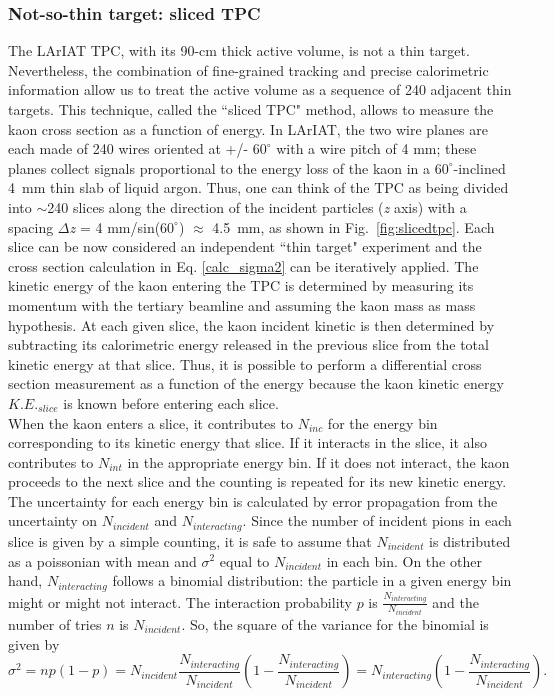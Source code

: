 \subsubsection{Not-so-thin target: sliced TPC}
\label{sec:thick}
The LArIAT TPC, with its 90-cm thick active volume, is not a thin target. Nevertheless, the combination of fine-grained tracking and precise calorimetric information allow us to treat the active volume as a sequence of 240 adjacent thin targets. This technique, called the ``sliced TPC" method, allows to measure the kaon cross section as a function of energy.  In LArIAT, the two wire planes are each made of 240 wires oriented at +/- $60^{\circ}$ with a wire pitch of 4 mm; these planes collect signals proportional to the energy loss of the kaon in a $60^{\circ}$-inclined 4~mm thin slab of liquid argon. Thus, one can think of the TPC as being divided into $\sim$240 slices along the direction of the incident particles ({\textit
{z}} axis) with a spacing $\Delta${\textit
{z}} = 4 mm/sin($60^{\circ}$) $\approx$ 4.5~mm, as shown in Fig.~\ref{fig:slicedtpc}. 
Each slice can be now considered an independent ``thin target" experiment and the cross section calculation in Eq. \ref{calc_sigma2} can be iteratively applied. The kinetic energy of the kaon entering the TPC is determined by measuring its momentum with the tertiary beamline and assuming the kaon mass as mass hypothesis. At each given slice, the kaon incident kinetic  is then determined by subtracting its calorimetric energy released in the previous slice from the total kinetic energy at that slice. Thus, it is possible to perform a differential cross section measurement as a function of the energy because the kaon kinetic energy $K.E._{slice}$  is known before entering each slice. \\ 
When the kaon enters a slice, it contributes to $N_{inc}$ for the energy bin corresponding to  its kinetic energy  that slice. If it interacts in the slice, it also contributes to $N_{int}$ in the appropriate energy bin. If it does not interact, the kaon proceeds to the next slice and the counting is repeated for its new kinetic energy.\\

The uncertainty for each energy bin is calculated by error propagation from the uncertainty on $N_{incident}$ and $N_{interacting}$. 
Since the number of incident pions in each slice is given by a simple counting, it is safe to assume that $N_{incident}$ is distributed as a poissonian with mean and $\sigma^2$ equal to $N_{incident}$ in each bin.  
On the other hand, $N_{interacting}$ follows a binomial distribution: the particle in a given energy bin might or might not interact.  The interaction probability $p$ is $\frac{ N_{interacting}}{N_{incident}}$ and the number of tries $n$ is $N_{incident}$. 
So, the square of the variance for the binomial is given by  $$\sigma^2 = np(1-p) =  N_{incident}\frac{ N_{interacting}}{N_{incident}} (1-\frac{ N_{interacting}}{N_{incident}}) = N_{interacting}(1-\frac{ N_{interacting}}{N_{incident}}).$$

